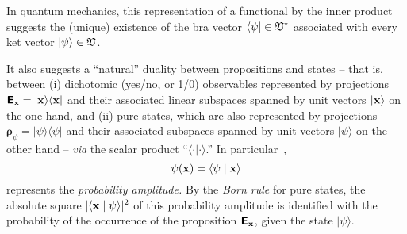 {\color{Purple}
In quantum mechanics,
this representation of a functional by the inner product suggests
the (unique) existence of
the bra vector $\langle \psi \vert \in {\frak V}^\ast $
associated with every ket vector $\vert \psi \rangle \in {\frak V}$.

It also suggests a ``natural'' duality between
propositions and states
--
that is, between (i)
dichotomic (yes/no, or 1/0) observables
represented by projections $\textsf{\textbf{E}}_{\bf x}= \vert {\bf x} \rangle \langle {\bf x} \vert$
and their associated linear subspaces  spanned by unit vectors  $\vert {\bf x} \rangle $
on the one hand,
and (ii) pure states, which are also represented by projections $\boldsymbol{\rho}_{\psi}= \vert \psi \rangle \langle \psi \vert$
and their associated subspaces spanned by unit vectors  $ \vert {\psi} \rangle$
on the other hand
--
{\em via} the scalar product ``$\langle \cdot \vert \cdot \rangle$.''
In particular~\cite{hamhalter-book},
\begin{equation}
{{\psi}} ({\bf x})  = \langle \psi \mid  {\bf x} \rangle
\end{equation}
represents the {\em probability amplitude.}
By the {\em Born rule}
for pure states,
the absolute square $\vert \langle {\bf x} \mid \psi \rangle \vert^2$
of this probability amplitude is identified with the probability of the occurrence of the proposition
$\textsf{\textbf{E}}_{\bf x}$,
given the state  $ \vert {\psi} \rangle$.

}

